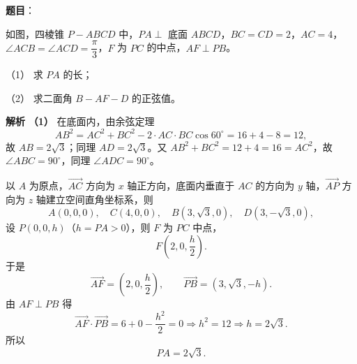 \begin{answer}

\textbf{题目}：

如图，四棱锥 $P-ABCD$ 中，$PA\perp$ 底面 $ABCD$，$BC=CD=2$，$AC=4$，$\angle ACB=\angle ACD=\dfrac\pi3$，$F$ 为 $PC$ 的中点，$AF\perp PB$。

（1） 求 $PA$ 的长；

（2） 求二面角 $B-AF-D$ 的正弦值。
\nopagebreak[4]
\begin{center}\end{center}
\nopagebreak[4]
\textbf{解析}
\textbf{（1）} 在底面内，由余弦定理
\nopagebreak[4]
\[AB^2=AC^2+BC^2-2\cdot AC\cdot BC\cos60^\circ=16+4-8=12,\]
故 $AB=2\sqrt3$；同理 $AD=2\sqrt3$。又 $AB^2+BC^2=12+4=16=AC^2$，故 $\angle ABC=90^\circ$，同理 $\angle ADC=90^\circ$。

以 $A$ 为原点，$\overrightarrow{AC}$ 方向为 $x$ 轴正方向，底面内垂直于 $AC$ 的方向为 $y$ 轴，$\overrightarrow{AP}$ 方向为 $z$ 轴建立空间直角坐标系，则
\nopagebreak[4]
\[A(0,0,0),\quad C(4,0,0),\quad B(3,\sqrt3,0),\quad D(3,-\sqrt3,0),\]
设 $P(0,0,h)$（$h=PA>0$），则 $F$ 为 $PC$ 中点，
\nopagebreak[4]
\[F\left(2,0,\frac h2\right).\]
于是
\nopagebreak[4]
\[\overrightarrow{AF}=\left(2,0,\frac h2\right),\qquad
\overrightarrow{PB}=(3,\sqrt3,-h).\]
由 $AF\perp PB$ 得
\nopagebreak[4]
\[\overrightarrow{AF}\cdot\overrightarrow{PB}=6+0-\frac{h^2}2=0\Longrightarrow h^2=12\Longrightarrow h=2\sqrt3.\]
所以
\nopagebreak[4]
\[PA=2\sqrt3.\]


\end{answer}

